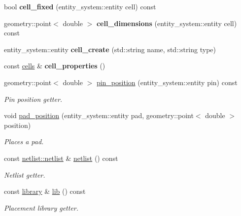 \begin{DoxyCompactItemize}
\item 
\hypertarget{classophidian_1_1placement_1_1placement_a13525a008e83a1a61f82b1b9c6915821}{bool {\bfseries cell\-\_\-fixed} (entity\-\_\-system\-::entity cell) const }\label{classophidian_1_1placement_1_1placement_a13525a008e83a1a61f82b1b9c6915821}

\item 
\hypertarget{classophidian_1_1placement_1_1placement_a76b6c79c8b670c832112864189137134}{geometry\-::point$<$ double $>$ {\bfseries cell\-\_\-dimensions} (entity\-\_\-system\-::entity cell) const }\label{classophidian_1_1placement_1_1placement_a76b6c79c8b670c832112864189137134}

\item 
\hypertarget{classophidian_1_1placement_1_1placement_a813d4f9884a785d6ac2661deb3d8c2d1}{entity\-\_\-system\-::entity {\bfseries cell\-\_\-create} (std\-::string name, std\-::string type)}\label{classophidian_1_1placement_1_1placement_a813d4f9884a785d6ac2661deb3d8c2d1}

\item 
\hypertarget{classophidian_1_1placement_1_1placement_a2fabbc69e4dea233981afb71051319da}{const \hyperlink{classophidian_1_1placement_1_1cells}{cells} \& {\bfseries cell\-\_\-properties} ()}\label{classophidian_1_1placement_1_1placement_a2fabbc69e4dea233981afb71051319da}

\item 
geometry\-::point$<$ double $>$ \hyperlink{classophidian_1_1placement_1_1placement_ad10656b5a3f46a885e3b9cc5a6bd38d9}{pin\-\_\-position} (entity\-\_\-system\-::entity pin) const 
\begin{DoxyCompactList}\small\item\em Pin position getter. \end{DoxyCompactList}\item 
void \hyperlink{classophidian_1_1placement_1_1placement_a8c7a6d62c69974f408cbfabf8cf70ed3}{pad\-\_\-position} (entity\-\_\-system\-::entity pad, geometry\-::point$<$ double $>$ position)
\begin{DoxyCompactList}\small\item\em Places a pad. \end{DoxyCompactList}\item 
const \hyperlink{classophidian_1_1netlist_1_1netlist}{netlist\-::netlist} \& \hyperlink{classophidian_1_1placement_1_1placement_a2e1a15ace1eb476ea2f7ce6d8d84e3c3}{netlist} () const 
\begin{DoxyCompactList}\small\item\em Netlist getter. \end{DoxyCompactList}\item 
const \hyperlink{classophidian_1_1placement_1_1library}{library} \& \hyperlink{classophidian_1_1placement_1_1placement_a302206279c67c772dff944b9fd4d19fb}{lib} () const 
\begin{DoxyCompactList}\small\item\em Placement library getter. \end{DoxyCompactList}\end{DoxyCompactItemize}


